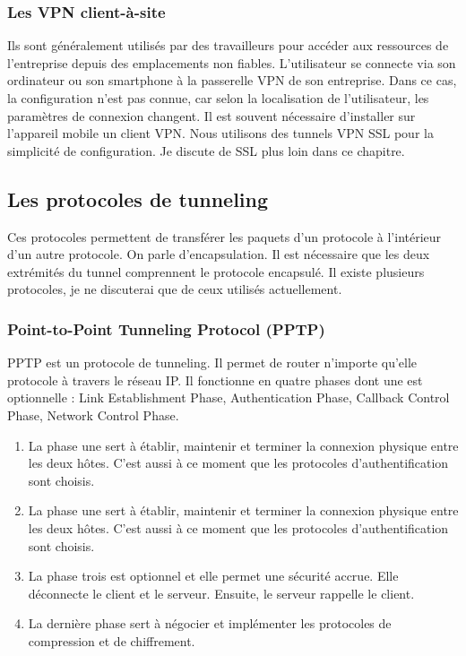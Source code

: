 \subsubsection{Les VPN client-à-site} 
Ils sont généralement utilisés par des travailleurs pour accéder aux ressources de l'entreprise depuis des emplacements non fiables.  
L'utilisateur se connecte via son ordinateur ou son smartphone à la passerelle VPN de son entreprise.  
Dans ce cas, la configuration n'est pas connue, car selon la localisation de l'utilisateur, les paramètres de connexion changent.  
Il est souvent nécessaire d'installer sur l'appareil mobile un client VPN. 
Nous utilisons des tunnels VPN SSL pour la simplicité de configuration. 
Je discute de SSL plus loin dans ce chapitre.

\subsection{Les protocoles de tunneling}
Ces protocoles permettent de transférer les paquets d'un protocole à l'intérieur d'un autre protocole. 
On parle d'encapsulation.  
Il est nécessaire que les deux extrémités du tunnel comprennent le protocole encapsulé.  
Il existe plusieurs protocoles, je ne discuterai que de ceux utilisés actuellement.
\subsubsection{Point-to-Point Tunneling Protocol (PPTP)}
PPTP est un protocole de tunneling. 
Il permet de router n'importe qu'elle protocole à travers le réseau IP. 
Il fonctionne en quatre phases dont une est optionnelle : Link Establishment Phase, Authentication Phase, Callback Control Phase, Network Control Phase.
\begin{enumerate}
	\item La phase une sert à établir, maintenir et terminer la connexion physique entre les deux hôtes. C'est aussi à ce moment que les protocoles d'authentification sont choisis.
	\item La phase une sert à établir, maintenir et terminer la connexion physique entre les deux hôtes. C'est aussi à ce moment que les protocoles d'authentification sont choisis.
	\item La phase trois est optionnel et elle permet une sécurité accrue. Elle déconnecte le client et le serveur. Ensuite, le serveur rappelle le client. 
	\item La dernière phase sert à négocier et implémenter les protocoles de compression et de chiffrement.
\end{enumerate}
